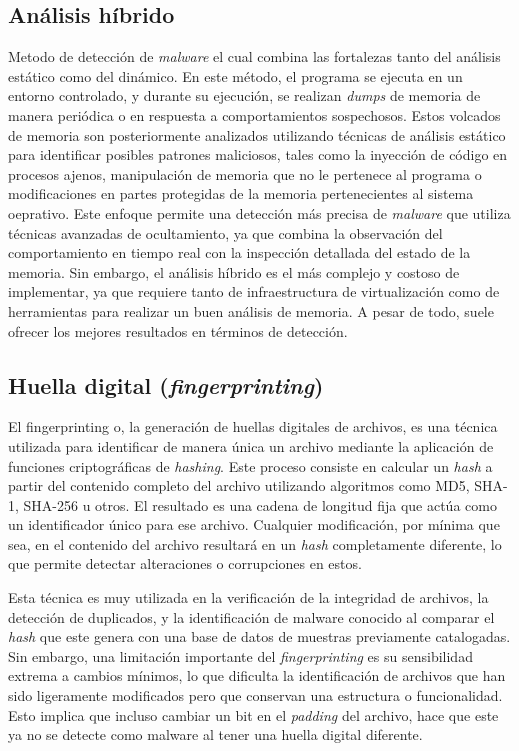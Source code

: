 \subsection{Análisis híbrido}
Metodo de detección de \textit{malware} el cual combina las fortalezas tanto del análisis estático como del dinámico. En este método, el programa se ejecuta en un entorno controlado, y durante su ejecución, se realizan \textit{dumps} de memoria de manera periódica o en respuesta a comportamientos sospechosos. Estos volcados de memoria son posteriormente analizados utilizando técnicas de análisis estático para identificar posibles  patrones maliciosos, tales como la inyección de código en procesos ajenos, manipulación de memoria que no le pertenece al programa o modificaciones en partes protegidas de la memoria pertenecientes al sistema oeprativo. Este enfoque permite una detección más precisa de \textit{malware} que utiliza técnicas avanzadas de ocultamiento, ya que combina la observación del comportamiento en tiempo real con la inspección detallada del estado de la memoria. Sin embargo, el análisis híbrido es el más complejo y costoso de implementar, ya que requiere tanto de infraestructura de virtualización como de herramientas para realizar un buen análisis de memoria. A pesar de todo, suele ofrecer los mejores resultados en términos de detección.

\subsection{Huella digital (\textit{fingerprinting})}
El fingerprinting o, la generación de huellas digitales de archivos, es una técnica utilizada para identificar de manera única un archivo mediante la aplicación de funciones criptográficas de \textit{hashing}. Este proceso consiste en calcular un \textit{hash} a partir del contenido completo del archivo utilizando algoritmos como MD5, SHA-1, SHA-256 u otros. El resultado es una cadena de longitud fija que actúa como un identificador único para ese archivo. Cualquier modificación, por mínima que sea, en el contenido del archivo resultará en un \textit{hash} completamente diferente, lo que permite detectar alteraciones o corrupciones en estos.

Esta técnica es muy utilizada en la verificación de la integridad de archivos, la detección de duplicados, y la identificación de malware conocido al comparar el \textit{hash} que este genera con una base de datos de muestras previamente catalogadas. Sin embargo, una limitación importante del \textit{fingerprinting} es su sensibilidad extrema a cambios mínimos, lo que dificulta la identificación de archivos que han sido ligeramente modificados pero que conservan una estructura o funcionalidad. Esto implica que incluso cambiar un bit en el \textit{padding} del archivo, hace que este ya no se detecte como malware al tener una huella digital diferente.

